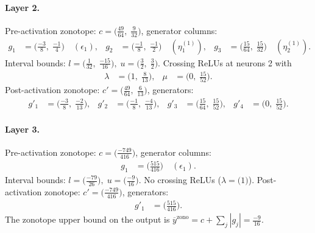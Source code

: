 \documentclass[11pt]{article}
\begin{document}
\paragraph{Layer 2.}
Pre-activation zonotope: $c = \bigl(\frac{49}{64},\; \frac{9}{32}\bigr)$, generator columns:
\begin{align*}
g_{1} &= \bigl(\frac{-3}{8},\; \frac{-1}{4}\bigr) \quad (\epsilon_{1}), &
g_{2} &= \bigl(\frac{-1}{8},\; \frac{-1}{2}\bigr) \quad (\eta^{(1)}_{1}), &
g_{3} &= \bigl(\frac{15}{64},\; \frac{15}{32}\bigr) \quad (\eta^{(1)}_{2}).
\end{align*}
Interval bounds: $l = \bigl(\frac{1}{32},\; \frac{-15}{16}\bigr), \; u = \bigl(\frac{3}{2},\; \frac{3}{2}\bigr)$. 
Crossing ReLUs at neurons 2 with
\begin{align*}
\lambda &= \bigl(1,\; \frac{8}{13}\bigr), & \mu &= \bigl(0,\; \frac{15}{52}\bigr).
\end{align*}
Post-activation zonotope: $c' = \bigl(\frac{49}{64},\; \frac{6}{13}\bigr)$, generators:
\begin{align*}
g'_{1} &= \bigl(\frac{-3}{8},\; \frac{-2}{13}\bigr), &
g'_{2} &= \bigl(\frac{-1}{8},\; \frac{-4}{13}\bigr), &
g'_{3} &= \bigl(\frac{15}{64},\; \frac{15}{52}\bigr), &
g'_{4} &= \bigl(0,\; \frac{15}{52}\bigr).
\end{align*}
\paragraph{Layer 3.}
Pre-activation zonotope: $c = \bigl(\frac{-749}{416}\bigr)$, generator columns:
\begin{align*}
g_{1} &= \bigl(\frac{515}{416}\bigr) \quad (\epsilon_{1}).
\end{align*}
Interval bounds: $l = \bigl(\frac{-79}{26}\bigr), \; u = \bigl(\frac{-9}{16}\bigr)$. 
No crossing ReLUs ($\lambda = \bigl(1\bigr)$).
Post-activation zonotope: $c' = \bigl(\frac{-749}{416}\bigr)$, generators:
\begin{align*}
g'_{1} &= \bigl(\frac{515}{416}\bigr).
\end{align*}
The zonotope upper bound on the output is $\overline{y}^{\text{zono}} = c + \sum_j |g_j| = \frac{-9}{16}$.
\end{document}
